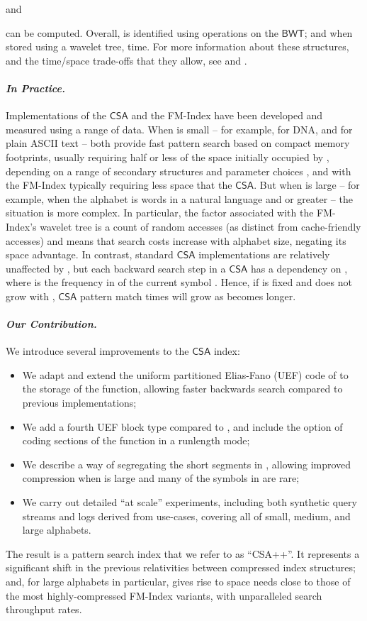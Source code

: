 \documentclass{llncs}
\newcommand{\myparagraph}[1]{\paragraph*{\normalsize\it#1.}}
\newcommand{\CSA}[0]{\ensuremath{\mathsf{CSA}}}
\newcommand{\BWT}[0]{\ensuremath{\mathsf{BWT}}}
\begin{document}
and

can be computed.
Overall,  is identified using 
 operations on the {\BWT}; and when stored using a wavelet
tree,  time.
For more information about these structures, and the time/space
trade-offs that they allow, see {\textcite{nm-csurv07}} and
{\textcite{fgnv-jea08}}.

\myparagraph{In Practice}


Implementations of the {\CSA} and the FM-Index have been developed
and measured using a range of data.
When  is small -- for example,  for DNA, and
 for plain ASCII text -- both provide fast
pattern search based on compact memory footprints, usually requiring
half or less of the space initially occupied by , depending on
a range of secondary structures and parameter choices
{\cite{gnp-jda15,hcvn-dcc14}}, and with the FM-Index typically
requiring less space that the {\CSA}.
But when  is large -- for example, when the
alphabet is words in a natural language and  or
greater -- the situation is more complex.
In particular, the  factor associated with the
FM-Index's wavelet tree is a count of random accesses (as distinct
from cache-friendly accesses) and means that search costs increase
with alphabet size, negating its space advantage.
In contrast, standard {\CSA} implementations are relatively
unaffected by , but each backward search step in a {\CSA} has
a dependency on , where  is the frequency in 
of the current symbol .
Hence, if  is fixed and does not grow with , {\CSA}
pattern match times will grow as  becomes longer.


\myparagraph{Our Contribution}


We introduce several improvements to the {\CSA} index:
\begin{itemize}
\item
We adapt and extend the uniform partitioned Elias-Fano (UEF) code
of {\citet{ov14sigir}} to the storage of the  function,
allowing faster backwards search compared to previous
implementations;
\item
We add a fourth UEF block type compared to {\citeauthor{ov14sigir}},
and include the option of coding sections of the  function in a runlength mode;
\item
We describe a way of segregating the short segments in ,
allowing improved compression when
 is large and many of the symbols in  are rare;
\item
We carry out detailed ``at scale'' experiments, including
both synthetic query streams and logs derived from
use-cases, covering all of small, medium, and large alphabets.
\end{itemize}
The result is a pattern search index that we refer to as ``CSA++''.
It represents a significant shift in the previous relativities
between compressed index structures; and, for large alphabets in
particular, gives rise to space needs close to those of the most
highly-compressed FM-Index variants, with unparalleled
search throughput rates.
\end{document}
